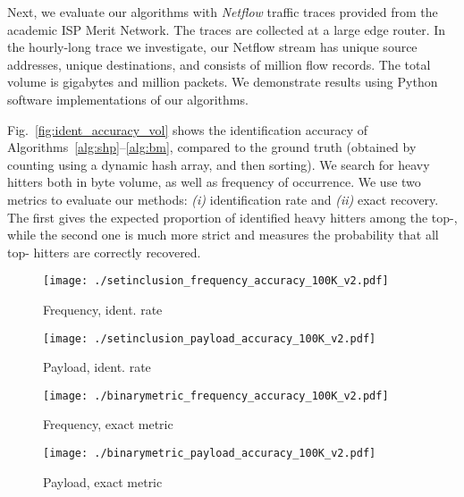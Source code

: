 \documentclass[10pt, conference, letterpaper,onecolumn]{IEEEtranv1.8}
\theoremstyle{plain}\newtheorem{thm}{Theorem}\newtheorem{lem}{Lemma}
\theoremstyle{definition}
\begin{document}
Next, we evaluate our algorithms with \emph{Netflow} traffic
traces provided from the academic ISP Merit Network. The traces are collected
at a large edge router. In the hourly-long trace we investigate,
our Netflow stream has  unique source addresses, 
unique destinations, and consists of  million flow records.
The total volume is  gigabytes and  million packets.
We demonstrate results using Python software implementations
of our algorithms. 


\smallskip
{} Fig.~\ref{fig:ident_accuracy_vol} shows the identification accuracy of 
Algorithms~\ref{alg:shp}--\ref{alg:bm}, compared to the ground truth (obtained by counting using a dynamic hash 
array, and then sorting). We search for heavy hitters both in byte volume, as well as frequency of occurrence. We 
use two metrics to evaluate our methods: {\em (i)} identification rate and {\it (ii)} exact recovery. 
The first gives the expected proportion of identified heavy hitters among the top-, while the second one is much 
more strict and measures the probability that all top- hitters are correctly recovered. 

\begin{figure*}        
        \begin{subfigure}[b]{0.24\textwidth}
                \texttt{[image: ./setinclusion\_frequency\_accuracy\_100K\_v2.pdf]}
                \caption{\footnotesize Frequency, ident. rate}
                \label{fig:freq_set100}
        \end{subfigure}
        \begin{subfigure}[b]{0.24\textwidth}
                \texttt{[image: ./setinclusion\_payload\_accuracy\_100K\_v2.pdf]}
                \caption{\footnotesize Payload, ident. rate}
                \label{fig:payload_set100}
        \end{subfigure}
        \begin{subfigure}[b]{0.24\textwidth}
                \texttt{[image: ./binarymetric\_frequency\_accuracy\_100K\_v2.pdf]}
                \caption{\footnotesize Frequency, exact metric}
                \label{fig:freq_binary100}
        \end{subfigure}
        \begin{subfigure}[b]{0.24\textwidth}
                \texttt{[image: ./binarymetric\_payload\_accuracy\_100K\_v2.pdf]}
                \caption{\footnotesize Payload, exact metric}
                \label{fig:payload_binary100}
        \end{subfigure}
        \vspace{-5pt}
        \caption{\footnotesize Identification accuracy results (window=100K).}
                \label{fig:ident_accuracy_vol}
\end{figure*}
\end{document}
